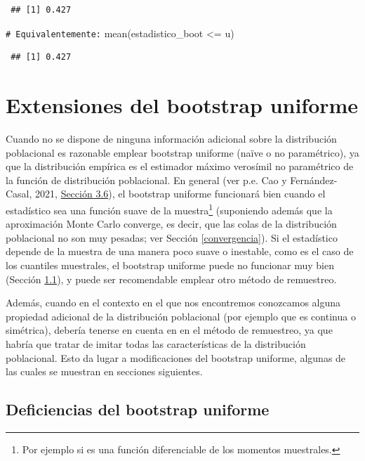 \documentclass[
  10pt,
]{book}
\newenvironment{Shaded}{\begin{snugshade}}{\end{snugshade}}
\newcommand{\CommentTok}[1]{\textcolor[rgb]{0.56,0.35,0.01}{\textit{#1}}}
\newcommand{\FunctionTok}[1]{\textcolor[rgb]{0.00,0.00,0.00}{#1}}
\newcommand{\NormalTok}[1]{#1}
\newcommand{\SpecialCharTok}[1]{\textcolor[rgb]{0.00,0.00,0.00}{#1}}
\theoremstyle{break}
\theoremstyle{nonumberplain}
\renewcommand{\CommentTok}[1]{\textcolor[rgb]{0.41,0.41,0.41}{\texttt{#1}}}
\let\oldfootnote\footnote
\renewcommand\footnote[1]{\oldfootnote{\hspace{2mm}#1}}
\begin{document}
\begin{verbatim}
 ## [1] 0.427
\end{verbatim}

\begin{Shaded}
\begin{Highlighting}[]
\CommentTok{\# Equivalentemente:}
\FunctionTok{mean}\NormalTok{(estadistico\_boot }\SpecialCharTok{\textless{}=}\NormalTok{ u)}
\end{Highlighting}
\end{Shaded}

\begin{verbatim}
 ## [1] 0.427
\end{verbatim}

\hypertarget{modunif}{%
\chapter{Extensiones del bootstrap uniforme}\label{modunif}}

Cuando no se dispone de ninguna información adicional sobre la distribución poblacional es razonable emplear bootstrap uniforme (naïve o no paramétrico), ya que la distribución empírica es el estimador máximo verosímil no paramétrico de la función de distribución poblacional.
En general (ver p.e. Cao y Fernández-Casal, 2021, \href{https://rubenfcasal.github.io/book_remuestreo/validez-de-la-aproximaci\%C3\%B3n-bootstrap.html}{Sección 3.6}), el bootstrap uniforme funcionará bien cuando el estadístico sea una función suave de la muestra\footnote{Por ejemplo si es una función diferenciable de los momentos muestrales.} (suponiendo además que la aproximación Monte Carlo converge, es decir, que las colas de la distribución poblacional no son muy pesadas; ver Sección \ref{convergencia}).
Si el estadístico depende de la muestra de una manera poco suave o inestable, como es el caso de los cuantiles muestrales, el bootstrap uniforme puede no funcionar muy bien (Sección \ref{deficien-unif}), y puede ser recomendable emplear otro método de remuestreo.

Además, cuando en el contexto en el que nos encontremos conozcamos alguna propiedad adicional de la distribución poblacional (por ejemplo que es continua o simétrica), debería tenerse en cuenta en en el método de remuestreo, ya que habría que tratar de imitar todas las características de la distribución poblacional.
Esto da lugar a modificaciones del bootstrap uniforme, algunas de las cuales se muestran en secciones siguientes.

\hypertarget{deficien-unif}{%
\section{Deficiencias del bootstrap uniforme}\label{deficien-unif}}
\end{document}
